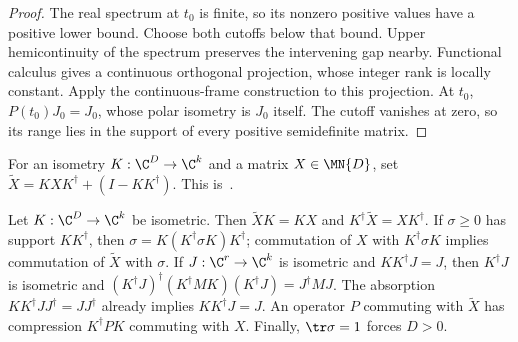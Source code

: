 \begin{proof}\leanok
    The real spectrum at $t_0$ is finite, so its nonzero positive values
    have a positive lower bound. Choose both cutoffs below that bound.
    Upper hemicontinuity of the spectrum preserves the intervening gap
    nearby. Functional calculus gives a continuous orthogonal projection,
    whose integer rank is locally constant. Apply the continuous-frame
    construction to this projection. At $t_0$, $P(t_0)J_0=J_0$, whose
    polar isometry is $J_0$ itself. The cutoff vanishes at zero, so its
    range lies in the support of every positive semidefinite matrix.
\end{proof}

\begin{definition}
    \label{def:spt_supported_matrix_extension}
    \leanok
    For an isometry $K:\C^D\to\C^k$ and a matrix $X\in\MN{D}$, set
    $\widetilde X=KXK^\dagger+(I-KK^\dagger)$.
    This is~\cite[``Extension of a matrix along an
        isometry'']{QICLean2026Blueprint}.
\end{definition}

\begin{lemma}
    \label{thm:spt_supported_frame_comparison}
    \leanok
    Let $K:\C^D\to\C^k$ be isometric. Then
    $\widetilde X K=KX$ and $K^\dagger\widetilde X=XK^\dagger$.
    If $\sigma\geq0$ has support $KK^\dagger$, then
    $\sigma=K(K^\dagger\sigma K)K^\dagger$; commutation of $X$ with
    $K^\dagger\sigma K$ implies commutation of $\widetilde X$ with $\sigma$.
    If $J:\C^r\to\C^k$ is isometric and $KK^\dagger J=J$, then
    $K^\dagger J$ is isometric and
    $(K^\dagger J)^\dagger(K^\dagger M K)(K^\dagger J)=J^\dagger M J$.
    The absorption $KK^\dagger JJ^\dagger=JJ^\dagger$ already implies
    $KK^\dagger J=J$.
    An operator $P$ commuting with $\widetilde X$ has compression
    $K^\dagger P K$ commuting with $X$.
    Finally, $\tr\sigma=1$ forces $D>0$.
\end{lemma}

